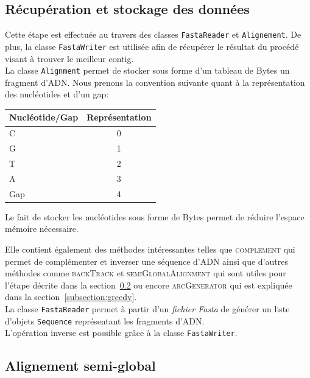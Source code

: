 \subsection{Récupération et stockage des données}
\label{subsection:recStock}

Cette étape est effectuée au travers des classes \verb|FastaReader| et \verb|Alignement|. De plus, la classe \verb|FastaWriter| est utilisée afin de récupérer le résultat du procédé visant à trouver le meilleur contig.\\

La classe \verb|Alignment| permet de stocker sous forme d'un tableau de Bytes un fragment d'ADN. Nous prenons la convention suivante quant à la représentation des nucléotides et d'un gap:
	\begin{center}
		\begin{tabular}{|l|c|}
			\hline
			Nucléotide/Gap & Représentation \\
			\hline
			\hline
			C & 0 \\
			\hline
			G & 1\\
			\hline
			T &  2 \\
			\hline
			A &  3 \\
			\hline
			Gap & 4 \\
			\hline

		\end{tabular}
	\end{center}

	Le fait de stocker les nucléotides sous forme de Bytes permet de réduire l'espace mémoire nécessaire.

	  Elle contient également des méthodes intéressantes telles que \textsc{complement} qui permet de complémenter et inverser une séquence d'ADN ainsi que d'autres méthodes comme \textsc{backTrack} et \textsc{semiGlobalAlignment} qui sont utiles pour l'étape décrite dans la section~\ref{subsection:semiGlobal} ou encore \textsc{arcGenerator} qui est expliquée dans la section~\ref{subsection:greedy}.\\

La classe \verb|FastaReader| permet à partir d'un \emph{fichier Fasta} de générer un liste d'objets \verb|Sequence| représentant les fragments d'ADN. \\

L'opération inverse est possible grâce à la classe \verb|FastaWriter|.





\subsection{Alignement semi-global}
\label{subsection:semiGlobal}

